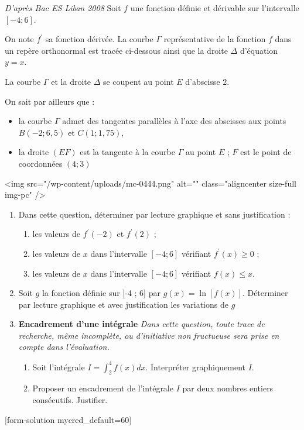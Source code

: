 
%
\textit{D'après Bac ES Liban 2008}
Soit $f$ une fonction définie et dérivable sur l'intervalle $\left[-4 ; 6\right]$.
\par
On note $f^{\prime}$ sa fonction dérivée. La courbe $\Gamma $ représentative de la fonction $f$ dans un repère orthonormal est tracée ci-dessous ainsi que la droite $\Delta $ d'équation $y=x$.
\par
La courbe $\Gamma $ et la droite $\Delta $ se coupent au point $E$ d'abscisse $2$.
\par
On sait par ailleurs que :
\begin{itemize}
     \item
     la courbe $\Gamma $ admet des tangentes parallèles à l'axe des abscisses aux points $B \left(-2 ; 6,5\right)$ et $C\left(1 ; 1,75\right)$,
     \item
     la droite $\left(EF\right)$ est la tangente à la courbe $\Gamma $ au point $E$ ; $F$ est le point de coordonnées $\left(4 ; 3\right)$
\end{itemize}

\begin{center}
\end{center}
<img src="/wp-content/uploads/mc-0444.png" alt="" class="aligncenter size-full  img-pc" />
\begin{enumerate}
     \item
     Dans cette question, déterminer par lecture graphique et sans justification :
     \begin{enumerate}
          \item
          les valeurs de $f^{\prime}\left(-2\right)$ et $f^{\prime}\left(2\right)$ ;
          \item
          les valeurs de $x$ dans l'intervalle $\left[-4 ; 6\right]$ vérifiant $f^{\prime}\left(x\right)\geqslant 0$ ;
          \item
          les valeurs de $x$ dans l'intervalle $\left[-4 ; 6\right]$ vérifiant $f\left(x\right) \leqslant x$.
     \end{enumerate}
     \item
     Soit $g$ la fonction définie sur ]-4 ; 6] par $g\left(x\right)=\ln\left[f\left(x\right)\right]$. Déterminer par lecture graphique et avec justification les variations de $g$
     \item
     \textbf{Encadrement d'une intégrale}
     \textit{Dans cette question, toute trace de recherche, même incomplète, ou d'initiative non fructueuse sera prise en compte dans l'évaluation.}
     \begin{enumerate}
          \item
          Soit l'intégrale $I=\int_{ 2}^{ 4} f\left(x\right) dx$. Interpréter graphiquement $I$.
          \item
          Proposer un encadrement de l'intégrale $I$ par deux nombres entiers consécutifs. Justifier.
     \end{enumerate}
\end{enumerate}
[form-solution mycred_default=60]
